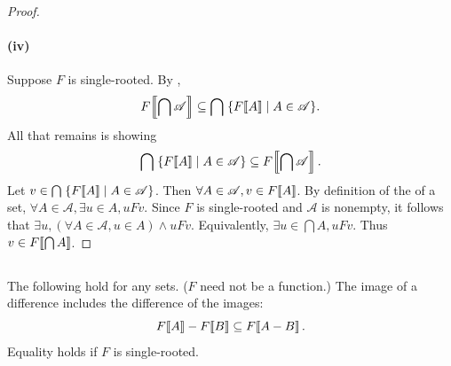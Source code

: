 \documentclass{report}
\begin{document}
\begin{proof}
  \paragraph{(iv)}%

    Suppose $F$ is single-rooted.
    By ,
      $$F\!\left\llbracket\bigcap\mathscr{A}\right\rrbracket \subseteq
        \bigcap\;\{F\!\left\llbracket A\right\rrbracket \mid A \in \mathscr{A}\}.$$
    All that remains is showing
      $$\bigcap\;\{F\!\left\llbracket A\right\rrbracket \mid A \in \mathscr{A}\} \subseteq
        F\!\left\llbracket\bigcap\mathscr{A}\right\rrbracket.$$
    Let $v \in \bigcap\;\{F\!\left\llbracket A\right\rrbracket \mid A \in \mathscr{A}\}$.
    Then $\forall A \in \mathscr{A}, v \in F\!\left\llbracket A\right\rrbracket$.
    By definition of the  of a set,
      $\forall A \in \mathscr{A}, \exists u \in A, uFv$.
    Since $F$ is single-rooted and $\mathscr{A}$ is nonempty, it follows that
      $\exists u, (\forall A \in \mathscr{A}, u \in A) \land uFv$.
    Equivalently, $\exists u \in \bigcap{A}, uFv$.
    Thus $v \in F\!\left\llbracket\bigcap{A}\right\rrbracket$.

\end{proof}

\subsection{}%
\label{sub:theorem-3k-c}

\begin{theorem}[3K(c)]

  The following hold for any sets. ($F$ need not be a function.)
  The image of a difference includes the difference of the images:
    \begin{equation}
      \label{sub:theorem-3k-c-eq1}
      F\!\left\llbracket A\right\rrbracket - F\!\left\llbracket B\right\rrbracket \subseteq F\!\left\llbracket A - B\right\rrbracket.
    \end{equation}
  Equality holds if $F$ is single-rooted.

\end{theorem}
\end{document}
